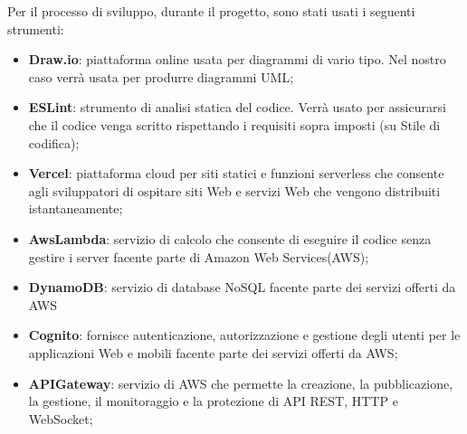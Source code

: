 Per il processo di sviluppo, durante il progetto, sono stati usati i seguenti strumenti:
\begin{itemize}
\item \textbf{Draw.io}: piattaforma online usata per diagrammi di vario tipo. Nel nostro caso verrà usata per produrre diagrammi UML;
\item \textbf{ESLint}: strumento di analisi statica del codice. Verrà usato per assicurarsi che il codice venga scritto rispettando i requisiti sopra imposti (su Stile di codifica);
\item \textbf{Vercel}: piattaforma cloud per siti statici e funzioni serverless che consente agli sviluppatori di ospitare siti Web e servizi Web che vengono distribuiti istantaneamente;
\item \textbf{AwsLambda}: servizio di calcolo che consente di eseguire il codice senza gestire i server facente parte di Amazon Web Services(AWS);
\item \textbf{DynamoDB}: servizio di database NoSQL facente parte dei servizi offerti da AWS
\item \textbf{Cognito}: fornisce autenticazione, autorizzazione e gestione degli utenti per le applicazioni Web e mobili facente parte dei servizi offerti da AWS;
\item \textbf{APIGateway}: servizio di AWS che permette la creazione, la pubblicazione, la gestione, il monitoraggio e la protezione di API REST, HTTP e WebSocket;
\end{itemize} 